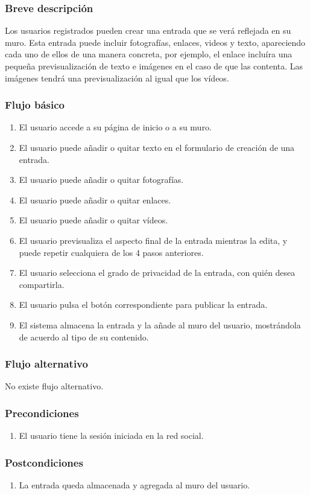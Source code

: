 \documentclass[12pt, a4paper, titlepage]{article}
\begin{document}
\subsubsection{Breve descripción}
Los usuarios registrados pueden crear una entrada que se verá reflejada en su muro. Esta entrada puede incluir fotografías, enlaces, videos y texto, apareciendo cada uno de ellos de una manera concreta, por ejemplo, el enlace incluíra una pequeña previsualización de texto e imágenes en el caso de que las contenta. Las imágenes tendrá una previsualización al igual que los vídeos.
\subsubsection{Flujo básico}
\begin{enumerate}
	\item El usuario accede a su página de inicio o a su muro.
	\item El usuario puede añadir o quitar texto en el formulario de creación de una entrada.
	\item El usuario puede añadir o quitar fotografías.
	\item El usuario puede añadir o quitar enlaces.
	\item El usuario puede añadir o quitar vídeos.
	\item El usuario previsualiza el aspecto final de la entrada mientras la edita, y puede repetir cualquiera de los 4 pasos anteriores.
	\item El usuario selecciona el grado de privacidad de la entrada, con quién desea compartirla.
	\item El usuario pulsa el botón correspondiente para publicar la entrada.
	\item El sistema almacena la entrada y la añade al muro del usuario, mostrándola de acuerdo al tipo de su contenido.
\end{enumerate}
\subsubsection{Flujo alternativo}
No existe flujo alternativo.
\subsubsection{Precondiciones}
\begin{enumerate}
	\item El usuario tiene la sesión iniciada en la red social.
\end{enumerate}
\subsubsection{Postcondiciones}
\begin{enumerate}
	\item La entrada queda almacenada y agregada al muro del usuario.
\end{enumerate}
\end{document}
